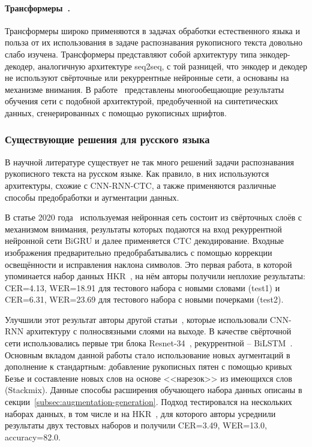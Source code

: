 \paragraph{Трансформеры~\cite{vaswani2017attention}.}{
    Трансформеры широко применяются в задачах обработки естественного языка и польза от их использования в
    задаче распознавания рукописного текста довольно слабо изучена.
    Трансформеры представляют собой архитектуру типа энкодер-декодер, аналогичную архитектуре seq2seq, с той разницей,
    что энкодер и декодер не используют свёрточные или рекуррентные нейронные сети, а основаны на механизме внимания.
    В работе~\cite{kang2022pay} представлены многообещающие результаты обучения сети с подобной архитектурой,
    предобученной на синтетических данных, сгенерированных с помощью рукописных шрифтов.
}


\subsubsection{Существующие решения для русского языка}
\label{subsubsec:networks-russian}

В научной литературе существует не так много решений задачи распознавания рукописного текста на русском языке.
Как правило, в них используются архитектуры, схожие с CNN-RNN-CTC, а также применяются различные способы предобработки и аугментации данных.

В статье 2020 года~\cite{abdallah2020attention} используемая нейронная сеть состоит из свёрточных слоёв с механизмом внимания,
результаты которых подаются на вход рекуррентной нейронной сети BiGRU и далее применяется CTC декодирование.
Входные изображения предварительно предобрабатывались с помощью коррекции освещённости и исправления наклона символов.
Это первая работа, в которой упоминается набор данных HKR~\cite{nurseitov2021handwritten},
на нём авторы получили неплохие результаты: CER=4.13, WER=18.91 для тестового набора с новыми словами (test1) и
CER=6.31, WER=23.69 для тестового набора с новыми почерками (test2).

Улучшили этот результат авторы другой статьи~\cite{shonenkov2021stackmix}, которые использовали CNN-RNN архитектуру с полносвязными слоями на выходе.
В качестве свёрточной сети использовались первые три блока Resnet-34~\cite{he2016deep}, рекуррентной -- BiLSTM~\cite{hochreiter1997long}.
Основным вкладом данной работы стало использование новых аугментаций в дополнение к стандартным:
добавление рукописных пятен с помощью кривых Безье и составление новых слов на основе <<нарезок>> из имеющихся слов (Stackmix).
Данные способы расширения обучающего набора данных описаны в секции~\ref{subsec:augmentation-generation}.
Подход тестировался на нескольких наборах данных, в том числе и на HKR~\cite{nurseitov2021handwritten},
для которого авторы усреднили результаты двух тестовых наборов и получили CER=3.49, WER=13.0, accuracy=82.0.


